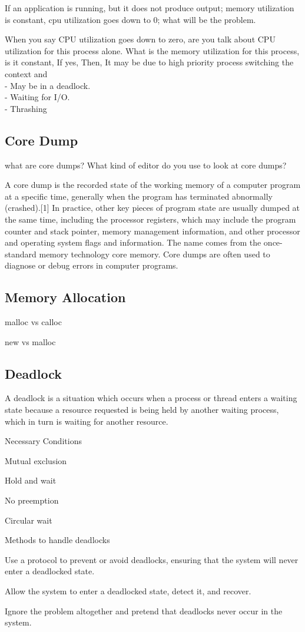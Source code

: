 If an application is running, but it does not produce output; memory utilization is constant, cpu utilization goes down to 0; what will be the problem.

When you say CPU utilization goes down to zero, are you talk about CPU utilization for this process alone. What is the memory utilization for this process, is it constant, If yes, 
Then, It may be due to high priority process switching the context and \\
- May be in a deadlock.\\
- Waiting for I/O. \\
- Thrashing

\subsection{Core Dump}
what are core dumps? What kind of editor do you use to look at core dumps?

A core dump is the recorded state of the working memory of a computer program at a specific time, generally when the program has terminated abnormally (crashed).[1] In practice, 
other key pieces of program state are usually dumped at the same time, including the processor registers, which may include the program counter and stack pointer, memory 
management information, and other processor and operating system flags and information. The name comes from the once-standard memory technology core memory. Core dumps are often 
used to diagnose or debug errors in computer programs.

\subsection{Memory Allocation}
malloc vs calloc

new vs malloc

\subsection{Deadlock}
A deadlock is a situation which occurs when a process or thread enters a waiting state because a resource requested is being held by another waiting process, 
which in turn is waiting for another resource.

Necessary Conditions
\begindot
\item Mutual exclusion
\item Hold and wait
\item No preemption
\item Circular wait
\myenddot

Methods to handle deadlocks

\begindot
\item[Deadlock Prevention]Use a protocol to prevent or avoid deadlocks, ensuring that the
system will never enter a deadlocked state.
\item[Deadlock Avoidance] Allow the system to enter a deadlocked state, detect it, and recover.
\item[Deadlock Detection] Ignore the problem altogether and pretend that deadlocks never
occur in the system.
\myenddot